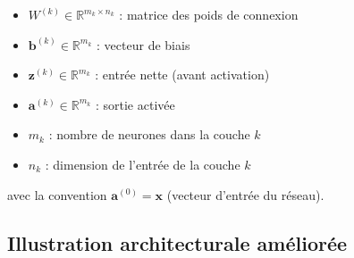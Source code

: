\documentclass[12pt,a4paper]{report}
\numberwithin{equation}{section}
\begin{document}
\begin{itemize}
  \item $W^{(k)} \in \mathbb{R}^{m_k \times n_k}$ : matrice des poids de connexion
  \item $\mathbf{b}^{(k)} \in \mathbb{R}^{m_k}$ : vecteur de biais
  \item $\mathbf{z}^{(k)} \in \mathbb{R}^{m_k}$ : entrée nette (avant activation)
  \item $\mathbf{a}^{(k)} \in \mathbb{R}^{m_k}$ : sortie activée
  \item $m_k$ : nombre de neurones dans la couche $k$
  \item $n_k$ : dimension de l'entrée de la couche $k$
\end{itemize}

avec la convention $\mathbf{a}^{(0)} = \mathbf{x}$ (vecteur d'entrée du réseau).

\subsection{Illustration architecturale améliorée}
\end{document}
